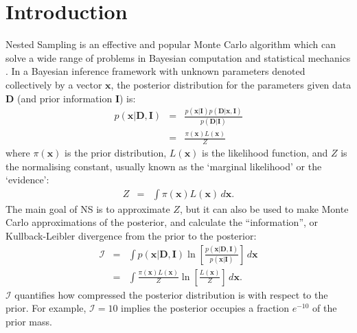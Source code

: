 \documentclass[journal,article,accept,moreauthors,pdftex,12pt,a4paper]{mdpi}
\newcommand{\xx}{\boldsymbol{x}}
\newcommand{\dx}{d\boldsymbol{x}}
\newcommand{\data}{\boldsymbol{D}}
\newcommand{\II}{\boldsymbol{I}}
\begin{document}

\section{Introduction}

Nested Sampling \citep[NS][]{skilling} is an effective and popular
Monte Carlo algorithm which can solve a wide range of problems in Bayesian
computation and statistical mechanics
\citep{2009arXiv0906.3544P, 2014PhRvE..89b2302P, 2015arXiv150303404B}.
In a Bayesian inference framework with unknown parameters denoted collectively
by a vector $\xx$, the
posterior distribution for the parameters given data $\data$ (and prior
information $\II$) is:
\begin{eqnarray}
p(\xx | \data, \II) &=&
\frac{p(\xx | \II)p(\data | \xx, \II)}{p(\data | \II)}\\
&=& \frac{\pi(\xx)L(\xx)}{Z}
\end{eqnarray}
where $\pi(\xx)$ is the prior distribution, $L(\xx)$ is the likelihood
function, and $Z$ is the normalising constant, usually known as the
`marginal likelihood' or the `evidence':
\begin{eqnarray}
Z &=& \int \pi(\xx) L(\xx) \, \dx.\label{eqn:evidence}
\end{eqnarray}
The main goal of NS is to approximate $Z$, but it can also be used to make
Monte Carlo approximations of the posterior, and calculate the ``information'',
or Kullback-Leibler divergence from the prior to the posterior:
\begin{eqnarray}
\mathcal{I} &=& \int p(\xx | \data, \II) \ln
\left[\frac{p(\xx | \data, \II)}{p(\xx | \II)}\right] \, d\xx \\
&=& \int \frac{\pi(\xx) L(\xx)}{Z} \ln
\left[\frac{L(\xx)}{Z}\right] \, d\xx.
\end{eqnarray}
$\mathcal{I}$ quantifies how compressed the posterior distribution is with
respect to the prior. For example, $\mathcal{I} = 10$ implies the posterior
occupies a fraction $e^{-10}$ of the prior mass.
\end{document}

